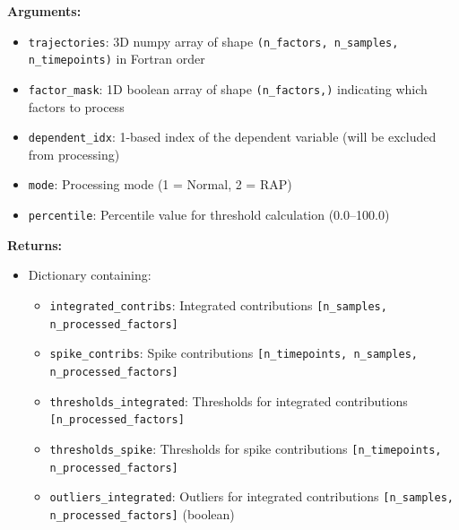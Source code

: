 \documentclass[11pt]{article}
\begin{document}
\begin{enumerate}
\begin{enumerate}
	      	      \textbf{Arguments:}
	      	      \begin{itemize}
	      	      	\item \texttt{trajectories}: 3D numpy array of shape \texttt{(n\_factors,
	      	      	      n\_samples, n\_timepoints)} in Fortran order
	      	      	
	      	      	\item \texttt{factor\_mask}: 1D boolean array of shape \texttt{(n\_factors,)}
	      	      	      indicating which factors to process
	      	      	      
	      	      	\item \texttt{dependent\_idx}: 1-based index of the dependent variable
	      	      	      (will be excluded from processing)
	      	      	      
	      	      	\item \texttt{mode}: Processing mode (1 = Normal, 2 = RAP)
	      	      	      
	      	      	\item \texttt{percentile}: Percentile value for threshold calculation
	      	      	      (0.0--100.0)
	      	      \end{itemize}
	      	      \textbf{Returns:}
	      	      \begin{itemize}
	      	      	\item Dictionary containing:
	      	      	      \begin{itemize}
	      	      	      	\item \texttt{integrated\_contribs}: Integrated contributions \texttt{[n\_samples,
	      	      	      	      n\_processed\_factors]}
	      	      	      	
	      	      	      	\item \texttt{spike\_contribs}: Spike contributions \texttt{[n\_timepoints,
	      	      	      	      n\_samples, n\_processed\_factors]}
	      	      	      	
	      	      	      	\item \texttt{thresholds\_integrated}: Thresholds for integrated
	      	      	      	      contributions \texttt{[n\_processed\_factors]}
	      	      	      	      
	      	      	      	\item \texttt{thresholds\_spike}: Thresholds for spike contributions
	      	      	      	      \texttt{[n\_timepoints, n\_processed\_factors]}
	      	      	      	      
	      	      	      	\item \texttt{outliers\_integrated}: Outliers for integrated contributions
	      	      	      	      \texttt{[n\_samples, n\_processed\_factors]} (boolean)
	      	      	      	      

\end{itemize}
\end{itemize}
\end{enumerate}
\end{enumerate}
\end{document}
